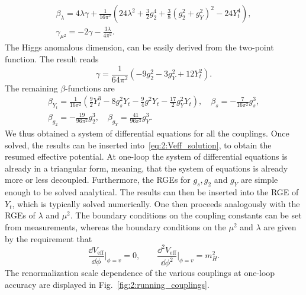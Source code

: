 \begin{equation}
\begin{gathered}
\beta_\lambda = 4 \lambda \gamma + \frac{1}{16 \pi^2} (24 \lambda^2 + \frac{3}{2} g_2^4 + \frac{3}{8} (g_2^2 + g_Y^2)^2 - 24 Y_t^4), \\
\gamma_{\mu^2} = - 2 \gamma - \frac{3 \lambda}{4 \pi^2}.
\end{gathered}
\end{equation}
The Higgs anomalous dimension, can be easily derived from the two-point function. The result reads
\begin{equation}
\gamma = \frac{1}{64 \pi^2} \left( -9 g_2^2 - 3 g_Y^2 + 12 Y_t^2 \right).
\end{equation}
The remaining $\beta$-functions are
\begin{equation}
\begin{gathered}
\beta_{Y_t} = \frac{1}{16 \pi^2} \left(\frac{9}{2} Y_t^3 - 8 g_s^2 Y_t - \frac{9}{4} g^2 Y_t - \frac{17}{2} g_Y^2 Y_t \right), \quad \beta_s = - \frac{7}{16 \pi^2} g_s^3, \\
\beta_{g_2} = - \frac{19}{96 \pi^2} g_2^3, \quad \beta_{g_Y} = \frac{41}{96 \pi^2} g_Y^3.
\end{gathered}
\end{equation}
We thus obtained a system of differential equations for all the couplings. Once solved, the results can be inserted into~\eqref{eq:2:Veff_solution}, to obtain the resumed effective potential. At one-loop the system of differential equations is already in a triangular form, meaning, that the system of equations is already more or less decoupled. Furthermore, the \acs{RGE}s for $g_s, g_2$ and $g_Y$ are simple enough to be solved analytical. The results can then be inserted into the \acs{RGE} of $Y_t$, which is typically solved numerically. One then proceeds analogously with the \acs{RGE}s of $\lambda$ and $\mu^2$. The boundary conditions on the coupling constants can be set from measurements, whereas the boundary conditions on the $\mu^2$ and $\lambda$ are given by the requirement that
\begin{equation}
\frac{\dd V_{\text{eff}}}{\dd \phi}\bigg \vert_{\phi = v} = 0, \qquad \frac{\dd^2 V_\text{eff}}{\dd \phi^2} \bigg \vert_{\phi = v} = m_H^2.
\end{equation}
The renormalization scale dependence of the various couplings at one-loop accuracy are displayed in Fig.~\ref{fig:2:running_couplings}.

